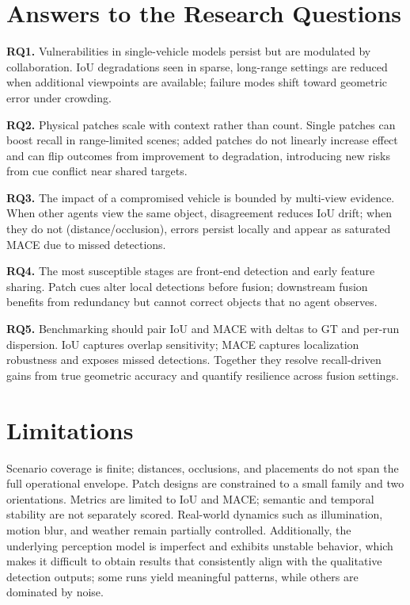 \section{Answers to the Research Questions}
\textbf{RQ1.} Vulnerabilities in single-vehicle models persist but are modulated by collaboration. IoU degradations seen in sparse, long-range settings are reduced when additional viewpoints are available; failure modes shift toward geometric error under crowding. 

\textbf{RQ2.} Physical patches scale with context rather than count. Single patches can boost recall in range-limited scenes; added patches do not linearly increase effect and can flip outcomes from improvement to degradation, introducing new risks from cue conflict near shared targets.  

\textbf{RQ3.} The impact of a compromised vehicle is bounded by multi-view evidence. When other agents view the same object, disagreement reduces IoU drift; when they do not (distance/occlusion), errors persist locally and appear as saturated MACE due to missed detections.  

\textbf{RQ4.} The most susceptible stages are front-end detection and early feature sharing. Patch cues alter local detections before fusion; downstream fusion benefits from redundancy but cannot correct objects that no agent observes.  

\textbf{RQ5.} Benchmarking should pair IoU and MACE with deltas to GT and per-run dispersion. IoU captures overlap sensitivity; MACE captures localization robustness and exposes missed detections. Together they resolve recall-driven gains from true geometric accuracy and quantify resilience across fusion settings.

\section{Limitations}
Scenario coverage is finite; distances, occlusions, and placements do not span the full operational envelope. Patch designs are constrained to a small family and two orientations. Metrics are limited to IoU and MACE; semantic and temporal stability are not separately scored. Real-world dynamics such as illumination, motion blur, and weather remain partially controlled. Additionally, the underlying perception model is imperfect and exhibits unstable behavior, which makes it difficult to obtain results that consistently align with the qualitative detection outputs; some runs yield meaningful patterns, while others are dominated by noise.

